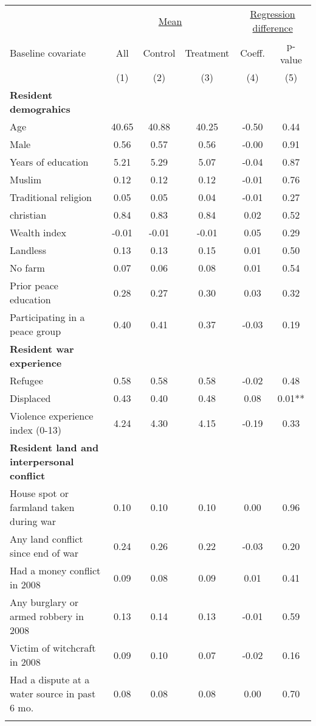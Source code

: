 \begin{tabular}{lccccc}
\hline \noalign{\smallskip} & \multicolumn{3}{c}{\uline{\hfill Mean \hfill}} & \multicolumn{2}{c}{\uline{\hfill Regression difference \hfill}}\\
Baseline covariate & All & Control & Treatment & Coeff. & p-value\\
 & (1) & (2) & (3) & (4) & (5)\\
\noalign{\smallskip}\hline \noalign{\smallskip}\textbf{Resident demograhics} &  &  &  &  & \\
Age & 40.65 & 40.88 & 40.25 & -0.50 & 0.44\\
Male & 0.56 & 0.57 & 0.56 & -0.00 & 0.91\\
Years of education & 5.21 & 5.29 & 5.07 & -0.04 & 0.87\\
Muslim & 0.12 & 0.12 & 0.12 & -0.01 & 0.76\\
Traditional religion & 0.05 & 0.05 & 0.04 & -0.01 & 0.27\\
christian & 0.84 & 0.83 & 0.84 & 0.02 & 0.52\\
Wealth index & -0.01 & -0.01 & -0.01 & 0.05 & 0.29\\
Landless & 0.13 & 0.13 & 0.15 & 0.01 & 0.50\\
No farm & 0.07 & 0.06 & 0.08 & 0.01 & 0.54\\
Prior peace education & 0.28 & 0.27 & 0.30 & 0.03 & 0.32\\
Participating in a peace group & 0.40 & 0.41 & 0.37 & -0.03 & 0.19\\
\textbf{Resident war experience} &  &  &  &  & \\
Refugee & 0.58 & 0.58 & 0.58 & -0.02 & 0.48\\
Displaced & 0.43 & 0.40 & 0.48 & 0.08 & 0.01**\\
Violence experience index (0-13) & 4.24 & 4.30 & 4.15 & -0.19 & 0.33\\
\textbf{Resident land and interpersonal conflict} &  &  &  &  & \\
House spot or farmland taken during war & 0.10 & 0.10 & 0.10 & 0.00 & 0.96\\
Any land conflict since end of war & 0.24 & 0.26 & 0.22 & -0.03 & 0.20\\
Had a money conflict in 2008 & 0.09 & 0.08 & 0.09 & 0.01 & 0.41\\
Any burglary or armed robbery in 2008 & 0.13 & 0.14 & 0.13 & -0.01 & 0.59\\
Victim of witchcraft in 2008 & 0.09 & 0.10 & 0.07 & -0.02 & 0.16\\
Had a dispute at a water source in past 6 mo. & 0.08 & 0.08 & 0.08 & 0.00 & 0.70\\
\noalign{\smallskip}\hline\end{tabular}
